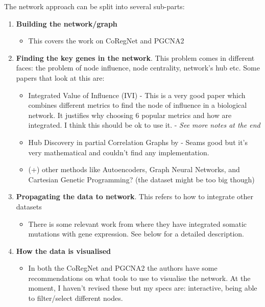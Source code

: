 The network approach can be split into several sub-parts:
\begin{enumerate}
    \item \textbf{Building the network/graph}
    \begin{itemize}
        \item This covers the work on CoRegNet \citet{Nicolle2015-tn} and PGCNA2 \citet{Care2019-ij}
    \end{itemize}
    \item \textbf{Finding the key genes in the network}. This problem comes in different faces: the problem of node influence, node centrality, network's hub etc. Some papers that look at this are:
    \begin{itemize}
        \item Integrated Value of Influence (IVI) \citet{Salavaty2020-wo} - This is a very good paper which combines different metrics to find the node of influence in a biological network. It justifies why choosing 6 popular metrics and how are integrated. I think this should be ok to use it.  - \textit{See more notes at the end}
        \item Hub Discovery in partial Correlation Graphs by \citet{Hero2012-ch} - Seams good but it's very mathematical and couldn't find any implementation.
        \item (+) other methods like Autoencoders, Graph Neural Networks, and Cartesian Genetic Programming? (the dataset might be too big though)
    \end{itemize}
    \item \textbf{Propagating the data to network}. This refers to how to integrate other datasets 
    \begin{itemize}
        \item There is some relevant work from \citet{He2017-dj} where they have integrated somatic mutations with gene expression. See below for a detailed description.
    \end{itemize}
    \item \textbf{How the data is visualised}
    \begin{itemize}
        \item In both the CoRegNet and PGCNA2 the authors have some recommendations on what tools to use to visualise the network. At the moment, I haven't revised these but my specs are: interactive, being able to filter/select different nodes.
    \end{itemize}
\end{enumerate}



